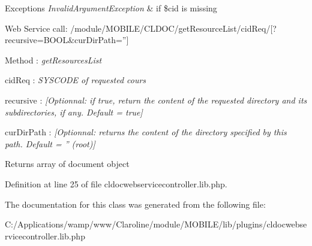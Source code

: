 \begin{DoxyExceptions}{Exceptions}
{\em InvalidArgumentException} & if \$cid is missing \\
\hline
\end{DoxyExceptions}
\begin{DoxyParagraph}{Web Service call: /module/MOBILE/CLDOC/getResourceList/cidReq/\mbox{[}?recursive=BOOL\&curDirPath=''\mbox{]}}

\end{DoxyParagraph}

\begin{DoxyPre}        Method : {\itshape getResourcesList\/}\end{DoxyPre}



\begin{DoxyPre}        cidReq : {\itshape SYSCODE of requested cours\/}\end{DoxyPre}



\begin{DoxyPre}        recursive : {\itshape [Optionnal: if true, return the content of the requested directory and its subdirectories, if any. Default = true]\/}\end{DoxyPre}



\begin{DoxyPre}        curDirPath : {\itshape [Optionnal: returns the content of the directory specified by this path. Default = '' (root)]\/}\end{DoxyPre}


\begin{DoxyReturn}{Returns}
array of document object 
\end{DoxyReturn}


Definition at line 25 of file cldocwebservicecontroller.lib.php.



The documentation for this class was generated from the following file:\begin{DoxyCompactItemize}
\item 
C:/Applications/wamp/www/Claroline/module/MOBILE/lib/plugins/cldocwebservicecontroller.lib.php\end{DoxyCompactItemize}
